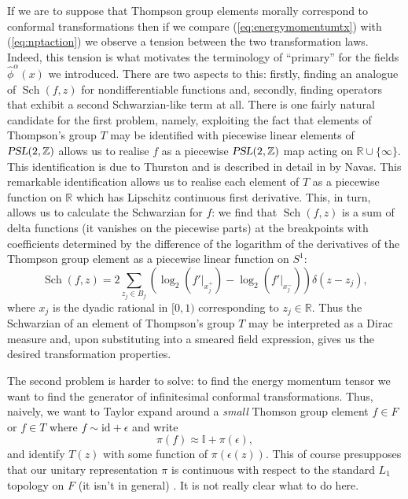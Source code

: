 \documentclass[11pt,oneside]{amsart}
\DeclareMathOperator{\Sch}{Sch}
\theoremstyle{plain}%
\theoremstyle{definition}
\theoremstyle{remark}
\begin{document}
If we are to suppose that Thompson group elements morally correspond to conformal transformations then if we compare (\ref{eq:energymomentumtx}) with (\ref{eq:nptaction}) we observe a tension between the two transformation laws. Indeed, this tension is what motivates the terminology of ``primary'' for the fields $\hat{\phi}^\alpha(x)$ we introduced. There are two aspects to this: firstly, finding an analogue of $\Sch(f,z)$ for nondifferentiable functions and, secondly, finding operators that exhibit a second Schwarzian-like term at all.  There is one fairly natural candidate for the first problem, namely, exploiting the fact that elements of Thompson's group $T$ may be identified with piecewise linear elements of $\textsl{PSL}(2,\mathbb{Z})$ allows us to realise $f$ as a piecewise $\textsl{PSL}(2,\mathbb{Z})$ map acting on $\mathbb{R}\cup \{\infty\}$. This identification is due to Thurston and is described in detail in \cite{Navas_2011} by Navas. This remarkable identification allows us to realise each element of $T$ as a piecewise function on $\mathbb{R}$ which has Lipschitz continuous first derivative. This, in turn, allows us to calculate the Schwarzian for $f$: we find that $\Sch(f,z)$ is a sum of delta functions (it vanishes on the piecewise parts) at the breakpoints with coefficients determined by the difference of the logarithm of the derivatives of the Thompson group element as a piecewise linear function on $S^1$:
\begin{equation}
  \Sch(f,z) = 2\sum_{z_j\in B_f} (\log_2(f'|_{x_j^+})-\log_2(f'|_{x_j^-}))\delta(z-z_j),
\end{equation}
where $x_j$ is the dyadic rational in $[0,1)$ corresponding to $z_j\in\mathbb{R}$. Thus the Schwarzian of an element of Thompson's group $T$ may be interpreted as a Dirac measure and, upon substituting into a smeared field expression, gives us the desired transformation properties.

The second problem is harder to solve: to find the energy momentum tensor we want to find the generator of infinitesimal conformal transformations. Thus, naively, we want to Taylor expand around a \emph{small} Thomson group element $f\in F$ or $f\in T$ where $f\sim \text{id}+\epsilon$ and write
\begin{equation}
	\pi(f) \approx \mathbb{I} + \pi(\epsilon),
\end{equation}
and identify $T(z)$ with some function of $\pi(\epsilon(z))$. This of course presupposes that our unitary representation $\pi$ is continuous with respect to the standard $L_1$ topology on $F$ (it isn't in general) \cites{jones_no-go_2016,klieschContinuumLimitsHomogeneous2018}. It is not really clear what to do here.
\end{document}
